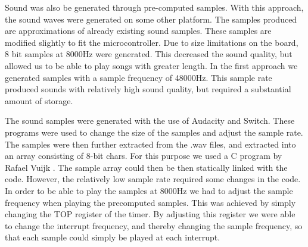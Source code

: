 
Sound was also be generated through pre-computed samples. With this approach, the sound waves were generated on some other platform. The samples produced are approximations of already existing sound samples. These samples are modified slightly to fit the microcontroller. Due to size limitations on the board, 8 bit samples at 8000Hz were generated. This decreased the sound quality, but allowed us to be able to play songs with greater length. In the first approach we generated samples with a sample frequency of 48000Hz. This sample rate produced sounds with relatively high sound quality, but required a substantial amount of storage.

The sound samples were generated with the use of Audacity\cite{audacity} and Switch\cite{switch}. These programs were used to change the size of the samples and adjust the sample rate. The samples were then further extracted from the .wav files, and extracted into an array consisting of 8-bit chars. For this purpose we used a C program by Rafael Vuijk \cite{darkfader}. The sample array could then be then statically linked with the code. However, the relatively low sample rate required some changes in the code. In order to be able to play the samples at 8000Hz we had to adjust the sample frequency when playing the precomputed samples. This was achieved by simply changing the TOP register of the timer. By adjusting this register we were able to change the interrupt frequency, and thereby changing the sample frequency, so that each sample could simply be played at each interrupt.